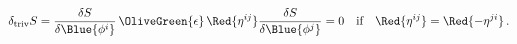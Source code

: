 \begin{equation}
  \delta_{\rm triv} S=\frac{\delta S}{\delta \Blue{\phi ^i}}\,\OliveGreen{\epsilon }\,\Red{\eta ^{ij}}\frac{\delta S}{\delta \Blue{\phi ^j}}
=0\quad \mbox{if}\quad \Red{\eta ^{ij}}=\Red{-\eta ^{ji}}\,.
 \label{delStriv}
\end{equation}

